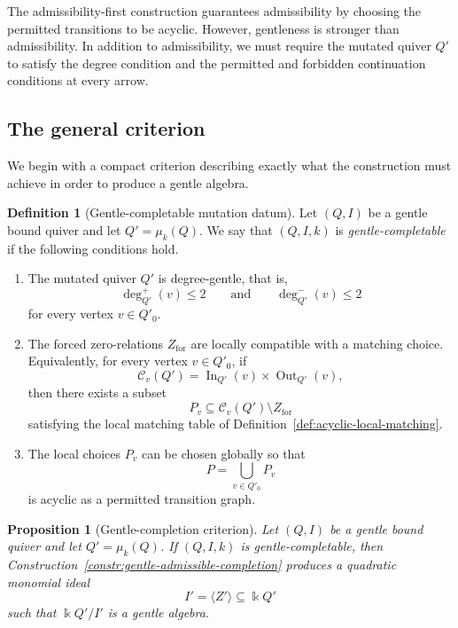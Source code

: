 \documentclass[11pt]{article}
\newcommand{\K}{\Bbbk}
\theoremstyle{plain}
\newtheorem{proposition}[theorem]{Proposition}
\theoremstyle{definition}
\newtheorem{definition}[theorem]{Definition}
\theoremstyle{remark}
\begin{document}
The admissibility-first construction guarantees admissibility by choosing the
permitted transitions to be acyclic.  However, gentleness is stronger than
admissibility.  In addition to admissibility, we must require the mutated quiver
\(Q'\) to satisfy the degree condition and the permitted and forbidden
continuation conditions at every arrow.

\subsection{The general criterion}

We begin with a compact criterion describing exactly what the construction must
achieve in order to produce a gentle algebra.

\begin{definition}[Gentle-completable mutation datum]
\label{def:gentle-completable-mutation-datum}
Let \((Q,I)\) be a gentle bound quiver and let \(Q'=\mu_k(Q)\).  We say that
\((Q,I,k)\) is \emph{gentle-completable} if the following conditions hold.
\begin{enumerate}[label=\textup{(G\arabic*)},leftmargin=3em]
  \item The mutated quiver \(Q'\) is degree-gentle, that is,
  \[
    \deg_{Q'}^+(v)\leq 2
    \qquad\text{and}\qquad
    \deg_{Q'}^-(v)\leq 2
  \]
  for every vertex \(v\in Q'_0\).

  \item The forced zero-relations \(Z_{\mathrm{for}}\) are locally compatible
  with a matching choice.  Equivalently, for every vertex \(v\in Q'_0\), if
  \[
    \mathcal C_v(Q')=
    \operatorname{In}_{Q'}(v)\times \operatorname{Out}_{Q'}(v),
  \]
  then there exists a subset
  \[
    P_v\subseteq \mathcal C_v(Q')\setminus Z_{\mathrm{for}}
  \]
  satisfying the local matching table of
  Definition~\ref{def:acyclic-local-matching}.

  \item The local choices \(P_v\) can be chosen globally so that
  \[
    P=\bigcup_{v\in Q'_0}P_v
  \]
  is acyclic as a permitted transition graph.
\end{enumerate}
\end{definition}

\begin{proposition}[Gentle-completion criterion]
\label{prop:gentle-completion-criterion}
Let \((Q,I)\) be a gentle bound quiver and let \(Q'=\mu_k(Q)\).  If
\((Q,I,k)\) is gentle-completable, then Construction~\ref{constr:gentle-admissible-completion}
produces a quadratic monomial ideal
\[
  I'=\langle Z'\rangle\subseteq \K Q'
\]
such that \(\K Q'/I'\) is a gentle algebra.
\end{proposition}
\end{document}
